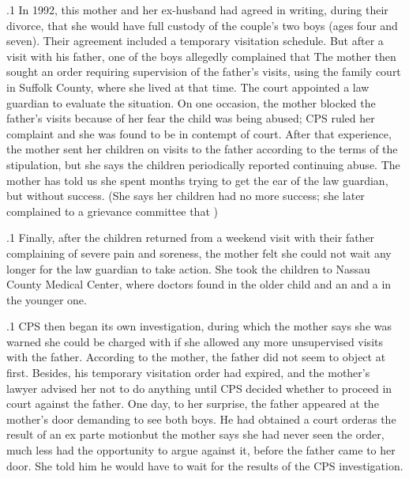 \documentclass[11pt, twoside]{article}
\begin{document}
{\p.1{%
In 1992, this mother and her ex-husband had agreed in writing, during their divorce, that she would have full custody of the couple’s two
boys (ages four and seven). Their agreement included a temporary visitation schedule. But after a visit with his father, one of the boys allegedly
complained that  The mother then
sought an order requiring supervision of the father’s visits, using the
family court in Suffolk County, where she lived at that time. The court
appointed a law guardian to evaluate the situation.
On one occasion, the mother blocked the father’s visits because of her
fear the child was being abused; CPS ruled her complaint 
and she was found to be in contempt of court. After that experience,
the mother sent her children on visits to the father according to the
terms of the stipulation, but she says the children periodically reported
continuing abuse. The mother has told us she spent months trying to get
the ear of the law guardian, but without success. (She says her children
had no more success; she later complained to a grievance committee
that )
}%

\p.1{%
Finally, after the children returned from a weekend visit with their father complaining of severe pain and soreness, the mother felt she could
not wait any longer for the law guardian to take action. She took the
children to Nassau County Medical Center, where doctors found  in the older child and an  and a  in the younger one.
}%

\p.1{%
CPS then began its own investigation, during which the mother says
she was warned she could be charged with  if she allowed any
more unsupervised visits with the father. According to the mother, the
father did not seem to object at first. Besides, his temporary visitation order had expired, and the mother’s lawyer advised her not to do anything
until CPS decided whether to proceed in court against the father.
One day, to her surprise, the father appeared at the mother’s door demanding to see both boys. He had obtained a court order\mdash{}as the result
of an ex parte motion\mdash{}but the mother says she had never seen the order, much less had the opportunity to argue against it, before the father
came to her door. She told him he would have to wait for the results of
the CPS investigation.
}%

}
\end{document}
